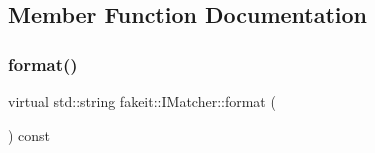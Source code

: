 \subsection{Member Function Documentation}
\mbox{\label{structfakeit_1_1IMatcher_a409d414a042236dc5e05e241dfd24a67}} 
\subsubsection{\texorpdfstring{format()}{format()}\hspace{0.1cm}{\footnotesize\ttfamily [1/9]}}
{\footnotesize\ttfamily virtual std\+::string fakeit\+::\+I\+Matcher\+::format (\begin{DoxyParamCaption}{ }\end{DoxyParamCaption}) const\hspace{0.3cm}{\ttfamily [pure virtual]}}



